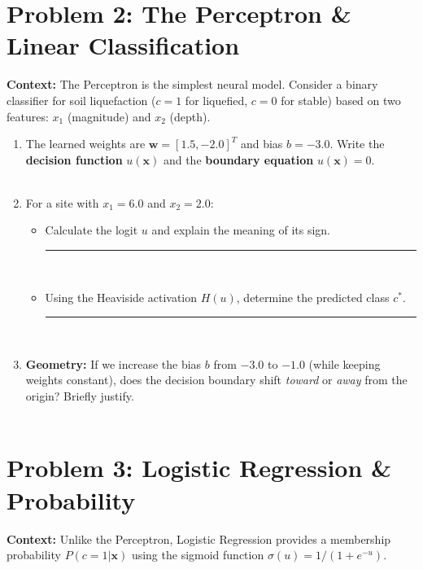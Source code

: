 \documentclass[12pt]{article}
\begin{document}
\section{Problem 2: The Perceptron \& Linear Classification}
\textbf{Context:} The Perceptron is the simplest neural model. Consider a binary classifier for soil liquefaction ($c=1$ for liquefied, $c=0$ for stable) based on two features: $x_1$ (magnitude) and $x_2$ (depth).

\begin{enumerate}[label=(\alph*)]
    \item The learned weights are $\bm{w} = [1.5, -2.0]^T$ and bias $b = -3.0$. Write the \textbf{decision function} $u(\bm{x})$ and the \textbf{boundary equation} $u(\bm{x})=0$. \\
    \fullunderline \\
    \fullunderline

    \item For a site with $x_1 = 6.0$ and $x_2 = 2.0$:
    \begin{itemize}
        \item Calculate the logit $u$ and explain the meaning of its sign. \rule{1.5in}{0.15mm} \\
        \fullunderline
        \item Using the Heaviside activation $H(u)$, determine the predicted class $c^*$. \rule{1in}{0.15mm} \\
        \fullunderline
    \end{itemize}

    \item \textbf{Geometry:} If we increase the bias $b$ from $-3.0$ to $-1.0$ (while keeping weights constant), does the decision boundary shift \textit{toward} or \textit{away} from the origin? Briefly justify. \\
    \fullunderline \\
    \fullunderline
\end{enumerate}

\section{Problem 3: Logistic Regression \& Probability}
\textbf{Context:} Unlike the Perceptron, Logistic Regression provides a membership probability $P(c=1|\bm{x})$ using the sigmoid function $\sigma(u) = 1/(1+e^{-u})$.
\end{document}
